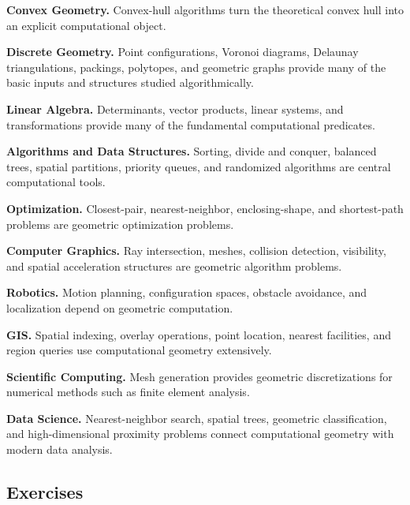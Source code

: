 \begin{applicationbox}
\textbf{Convex Geometry.}
Convex-hull algorithms turn the theoretical convex hull into an explicit
computational object.

\medskip

\textbf{Discrete Geometry.}
Point configurations, Voronoi diagrams, Delaunay triangulations, packings,
polytopes, and geometric graphs provide many of the basic inputs and
structures studied algorithmically.

\medskip

\textbf{Linear Algebra.}
Determinants, vector products, linear systems, and transformations provide
many of the fundamental computational predicates.

\medskip

\textbf{Algorithms and Data Structures.}
Sorting, divide and conquer, balanced trees, spatial partitions, priority
queues, and randomized algorithms are central computational tools.

\medskip

\textbf{Optimization.}
Closest-pair, nearest-neighbor, enclosing-shape, and shortest-path problems
are geometric optimization problems.

\medskip

\textbf{Computer Graphics.}
Ray intersection, meshes, collision detection, visibility, and spatial
acceleration structures are geometric algorithm problems.

\medskip

\textbf{Robotics.}
Motion planning, configuration spaces, obstacle avoidance, and localization
depend on geometric computation.

\medskip

\textbf{GIS.}
Spatial indexing, overlay operations, point location, nearest facilities,
and region queries use computational geometry extensively.

\medskip

\textbf{Scientific Computing.}
Mesh generation provides geometric discretizations for numerical methods
such as finite element analysis.

\medskip

\textbf{Data Science.}
Nearest-neighbor search, spatial trees, geometric classification, and
high-dimensional proximity problems connect computational geometry with
modern data analysis.
\end{applicationbox}

\subsection{Exercises}
\label{subsec:computational-geometry-exercises}

